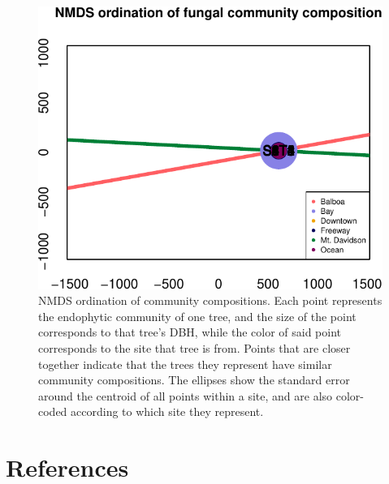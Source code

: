 \documentclass[fleqn,10pt,lineno]{wlpeerj} %
\begin{document}
\begin{figure}
\centering
\includegraphics{gibson2021_files/figure-latex/ordination-1.pdf}
\caption{\label{fig:ordination}NMDS ordination of community compositions. Each point represents the endophytic community of one tree, and the size of the point corresponds to that tree's DBH, while the color of said point corresponds to the site that tree is from. Points that are closer together indicate that the trees they represent have similar community compositions. The ellipses show the standard error around the centroid of all points within a site, and are also color-coded according to which site they represent.}
\end{figure}

\hypertarget{references}{%
\section*{References}\label{references}}
\end{document}
